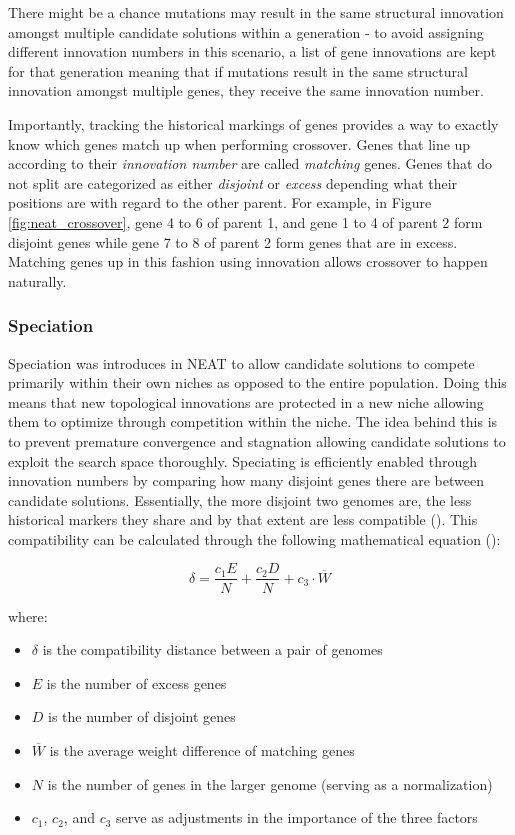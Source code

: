 \parbreak\noindent There might be a chance mutations may result in the same structural innovation amongst multiple candidate solutions within a generation - to avoid assigning different innovation numbers in this scenario, a list of gene innovations are kept for that generation meaning that if mutations result in the same structural innovation amongst multiple genes, they receive the same innovation number.

\parbreak\noindent Importantly, tracking the historical markings of genes provides a way to exactly know which genes match up when performing crossover. Genes that line up according to their \textit{innovation number} are called \textit{matching} genes. Genes that do not split are categorized as either \textit{disjoint} or \textit{excess} depending what their positions are with regard to the other parent. For example, in Figure \ref{fig:neat_crossover}, gene 4 to 6 of parent 1, and gene 1 to 4 of parent 2 form disjoint genes while gene 7 to 8 of parent 2 form genes that are in excess. Matching genes up in this fashion using innovation allows crossover to happen naturally.

\subsubsection{Speciation}
Speciation was introduces in NEAT to allow candidate solutions to compete primarily within their own niches as opposed to the entire population. Doing this means that new topological innovations are protected in a new niche allowing them to optimize through competition within the niche. The idea behind this is to prevent premature convergence and stagnation allowing candidate solutions to exploit the search space thoroughly. Speciating is efficiently enabled through innovation numbers by comparing how many disjoint genes there are between candidate solutions. Essentially, the more disjoint two genomes are, the less historical markers they share and by that extent are less compatible (\cite{stanley2002evolving}). This compatibility can be calculated through the following mathematical equation (\cite{stanley2002evolving}):
\begin{ceqn}
    \begin{equation}\label{alg:speciation}
        \delta = \frac{c_1E}{N} + \frac{c_2D}{N} + c_3\cdot{\overline{W}}
    \end{equation}
\end{ceqn}

\noindent where:
\begin{itemize}
    \item $\delta$ is the compatibility distance between a pair of genomes
    \item $E$ is the number of excess genes
    \item $D$ is the number of disjoint genes
    \item $\overline{W}$ is the average weight difference of matching genes
    \item $N$ is the number of genes in the larger genome (serving as a normalization)
    \item $c_1$, $c_2$, and $c_3$ serve as adjustments in the importance of the three factors
\end{itemize}

